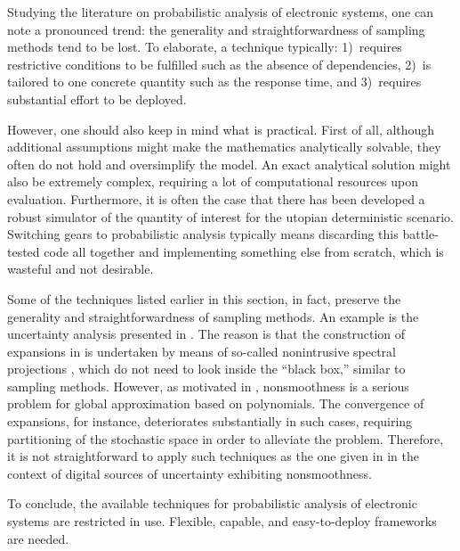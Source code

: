 Studying the literature on probabilistic analysis of electronic systems, one can
note a pronounced trend: the generality and straightforwardness of sampling
methods tend to be lost. To elaborate, a technique typically: 1)~requires
restrictive conditions to be fulfilled such as the absence of dependencies,
2)~is tailored to one concrete quantity such as the response time, and
3)~requires substantial effort to be deployed.

However, one should also keep in mind what is practical. First of all, although
additional assumptions might make the mathematics analytically solvable, they
often do not hold and oversimplify the model. An exact analytical solution might
also be extremely complex, requiring a lot of computational resources upon
evaluation. Furthermore, it is often the case that there has been developed a
robust simulator of the quantity of interest for the utopian deterministic
scenario. Switching gears to probabilistic analysis typically means discarding
this battle-tested code all together and implementing something else from
scratch, which is wasteful and not desirable.

Some of the techniques listed earlier in this section, in fact, preserve the
generality and straightforwardness of sampling methods. An example is the
uncertainty analysis presented in \cite{ukhov2015}. The reason is that the
construction of  expansions in \cite{ukhov2015} is undertaken by means of
so-called nonintrusive spectral projections \cite{xiu2010}, which do not need to
look inside the ``black box,'' similar to sampling methods. However, as
motivated in , nonsmoothness is a serious problem for global
approximation based on polynomials. The convergence of  expansions, for
instance, deteriorates substantially in such cases, requiring partitioning of
the stochastic space in order to alleviate the problem. Therefore, it is not
straightforward to apply such techniques as the one given in \cite{ukhov2015} in
the context of digital sources of uncertainty exhibiting nonsmoothness.

To conclude, the available techniques for probabilistic analysis of electronic
systems are restricted in use. Flexible, capable, and easy-to-deploy frameworks
are needed.
